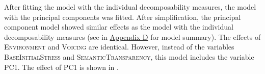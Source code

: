     \begin{table}
    	\caption{ Summary of linear model for variables predicting the relative  duration of [s] in prefixed words with voiceless /s/}
    	\label{tbl: summary model7}
    	
    	
    \end{table}



After fitting the model with the individual decomposability measures, the model with the principal components was fitted. After simplification, the principal component model showed similar effects as the model with the individual decomposability measures (see  in \hyperref[Appendix D: model summaries corpus]{Appendix D} for model summary). The effects of \textsc{Environment} and \textsc{Voicing} are identical. However, instead of the variables \textsc{BaseInitialStress} and \textsc{SemanticTransparency}, this model includes the variable \textsc{PC1}. 
The effect of \textsc{PC1} is shown in . 


